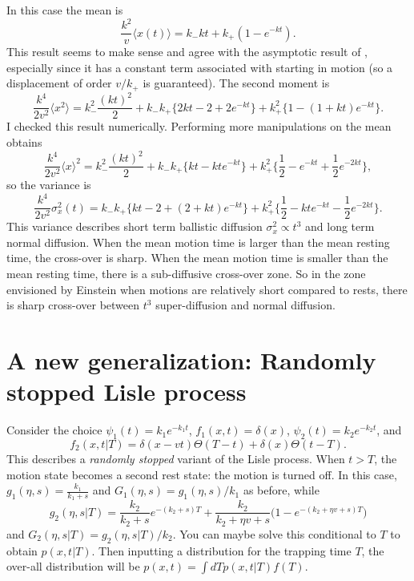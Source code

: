 \documentclass[11pt]{article}
\newcommand\be{\begin{equation}} %
\newcommand\ee{\end{equation}}   %
\newcommand\bra{\langle}
\newcommand\ket{\rangle}
\begin{document}
In this case the mean is
\be  \frac{k^2}{v}\bra x(t) \ket = k_- kt + k_+(1-e^{-kt}).\ee
This result seems to make sense and agree with the asymptotic result of \citet{Lisle1998}, especially since it has a constant term associated with starting in motion (so a displacement of order $v/k_+$ is guaranteed).
The second moment is
\be
\frac{k^4}{2v^2}\bra x^2 \ket = k_-^2\frac{(kt)^2}{2} + k_-k_+\{2kt -2 + 2e^{-kt}\} + k_+^2\{1-(1+kt)e^{-kt}\}.
\ee
I checked this result numerically.
Performing more manipulations on the mean obtains
\be\frac{k^4}{2v^2} \bra x\ket^2 = k_-^2 \frac{(kt)^2}{2} + k_-k_+\{kt - kte^{-kt}\} +  k_+^2\{\frac{1}{2} - e^{-kt} + \frac{1}{2}e^{-2kt}\}   ,\ee
so the variance is
\be \frac{k^4}{2v^2} \sigma_x^2(t) = k_- k_+ \{kt -2 + (2 + kt)e^{-kt}\} + k_+^2\{\frac{1}{2} -kt e^{-kt} - \frac{1}{2}e^{-2kt}\}.\ee
This variance describes short term ballistic diffusion $\sigma_x^2 \propto t^3$ and long term normal diffusion.
When the mean motion time is larger than the mean resting time, the cross-over is sharp.
When the mean motion time is smaller than the mean resting time,
there is a sub-diffusive cross-over zone.
So in the zone envisioned by Einstein when motions are relatively short compared to rests, there is sharp cross-over between $t^3$ super-diffusion and normal diffusion.
 
\section{A new generalization: Randomly stopped Lisle process}

Consider the choice $\psi_1(t) = k_1e^{-k_1t}$, $f_1(x,t)=\delta(x)$, $\psi_2(t) = k_2e^{-k_2t}$, and 
\be f_2(x,t|T) = \delta(x-vt)\Theta(T-t) + \delta(x)\Theta(t-T).\ee
This describes a \textit{randomly stopped} variant of the Lisle process.
When $t>T$, the motion state becomes a second rest state: the motion is turned off.
In this case, $g_1(\eta,s) = \frac{k_1}{k_1+s}$ and $G_1(\eta,s) = g_1(\eta,s)/k_1$ as before, while
\be g_2(\eta,s|T) = \frac{k_2}{k_2+s}e^{-(k_2+s)T} + \frac{k_2}{k_2 + \eta v + s}\Big(1-e^{-(k_2 + \eta v + s)T}\Big)\ee
and $G_2(\eta,s|T) = g_2(\eta,s|T)/k_2$.
You can maybe solve this conditional to $T$ to obtain $p(x,t|T)$.
Then inputting a distribution for the trapping time $T$, the over-all distribution will be $p(x,t) = \int dT p(x,t|T)f(T)$.
\end{document}
